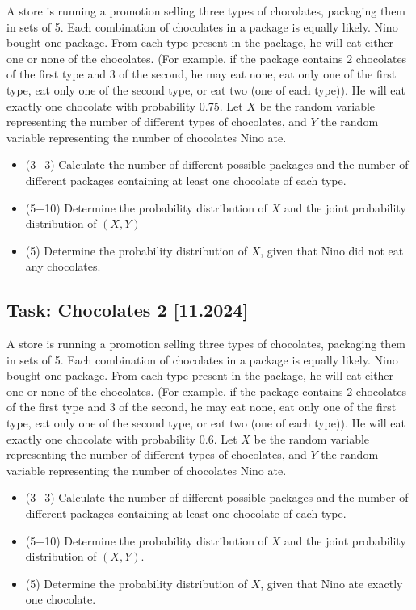 \documentclass[a4paper, 12pt]{article}
\begin{document}
A store is running a promotion selling three types of chocolates, packaging them in sets of 5. Each combination of chocolates in a package is equally likely. Nino bought one package. From each type present in the package, he will eat either one or none of the chocolates. (For example, if the package contains 2 chocolates of the first type and 3 of the second, he may eat none, eat only one of the first type, eat only one of the second type, or eat two (one of each type)). He will eat exactly one chocolate with probability 0.75.
Let $X$ be the random variable representing the number of different types of chocolates, and $Y$ the random variable representing the number of chocolates Nino ate.

\begin{itemize}
    \item [a)] (3+3) Calculate the number of different possible packages and the number of different packages containing at least one chocolate of each type.

    \item [b)] (5+10) Determine the probability distribution of $X$ and the joint probability distribution of $(X,Y)$

    \item [c)] (5) Determine the probability distribution of $X$, given that Nino did not eat any chocolates.
\end{itemize}



\subsection{Task: Chocolates 2 [11.2024]}

A store is running a promotion selling three types of chocolates, packaging them in sets of 5. Each combination of chocolates in a package is equally likely. Nino bought one package. From each type present in the package, he will eat either one or none of the chocolates. (For example, if the package contains 2 chocolates of the first type and 3 of the second, he may eat none, eat only one of the first type, eat only one of the second type, or eat two (one of each type)). He will eat exactly one chocolate with probability 0.6.
Let $X$ be the random variable representing the number of different types of chocolates, and $Y$ the random variable representing the number of chocolates Nino ate.

\begin{itemize}
    \item [a)] (3+3) Calculate the number of different possible packages and the number of different packages containing at least one chocolate of each type.

    \item [b)] (5+10) Determine the probability distribution of $X$ and the joint probability distribution of $(X, Y)$.

    \item [c)] (5) Determine the probability distribution of $X$, given that Nino ate exactly one chocolate.
\end{itemize}
\end{document}

